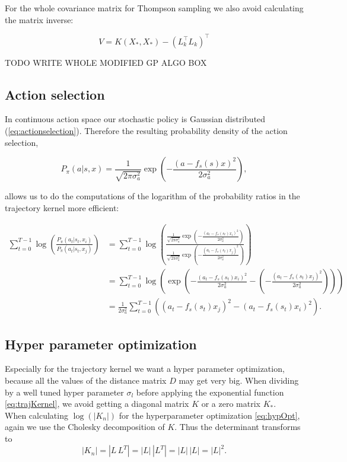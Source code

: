 For the whole covariance matrix for Thompson sampling we also avoid calculating the matrix inverse:

$$V = K(X_*,X_*) - (L_k^\top L_k)^\top $$

TODO WRITE WHOLE MODIFIED GP ALGO BOX

\subsection{Action selection}

In continuous action space our stochastic policy is Gaussian distributed (\ref{eq:actionselection}). Therefore the resulting probability density of the action selection,

$$P_{\pi}(a|s,x) = \frac{1}{\sqrt{2\pi\sigma_a^2}}\exp\left(-\frac{(a-f_s(s)x)^2}{2\sigma_a^2}\right),$$

allows us to do the computations of the logarithm of the probability ratios in the trajectory kernel more efficient:

\begin{align*}
    \sum_{t=0}^{T-1} \log \left(\frac{P_{\pi}(a_{t}|s_{t},x_i)}{P_{\pi}(a_{t}|s_{t},x_j)}\right) &= \sum_{t=0}^{T-1} \log \left(\frac{\frac{1}{\sqrt{2\pi\sigma_a^2}}\exp\left(-\frac{(a_t-f_s(s_t)x_i)^2}{2\sigma_a^2}\right)}{\frac{1}{\sqrt{2\pi\sigma_a^2}}\exp\left(-\frac{(a_t-f_s(s_t)x_j)^2}{2\sigma_a^2}\right)}\right)\\
    &= \sum_{t=0}^{T-1} \log \left( \exp \left( -\frac{(a_t-f_s(s_t)x_i)^2}{2\sigma_a^2} - \left(-\frac{(a_t-f_s(s_t)x_j)^2}{2\sigma_a^2}\right)\right)\right)\\
    &= \frac{1}{2\sigma_a^2} \sum_{t=0}^{T-1} \left((a_t-f_s(s_t)x_j)^2 - (a_t-f_s(s_t)x_i)^2\right).
\end{align*}

\subsection{Hyper parameter optimization}

Especially for the trajectory kernel we want a hyper parameter optimization, because all the values of the distance matrix $D$ may get very big. When dividing by a well tuned hyper parameter $\sigma_l$ before applying the exponential function \eqref{eq:trajKernel}, we avoid getting a diagonal matrix $K$ or a zero matrix $K_*$.\\

When calculating $\log(|K_n|)$ for the hyperparameter optimization \eqref{eq:hypOpt}, again we use the Cholesky decomposition of $K$. Thus the determinant transforms to
$$|K_n|=|L\,L^{T}|=|L|\,|L^{T}|=|L|\,|L|=|L|^{2}.$$

